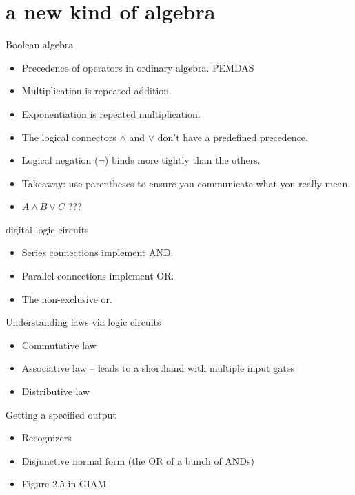 \documentclass[landscape]{beamer}
\begin{document}
\section{a new kind of algebra}

\begin{frame}{Boolean algebra}
\begin{itemize}
\item Precedence of operators in ordinary algebra. \pause PEMDAS \pause
\item Multiplication is repeated addition. \pause
\item Exponentiation is repeated multiplication. \pause
\item The logical connectors $\land$ and $\lor$ don't have a predefined precedence. \pause
\item Logical negation ($\lnot$) binds more tightly than the others. \pause
\item Takeaway: use parentheses to ensure you communicate what you really mean.\pause
\item $A \land B \lor C$ ???
\end{itemize}
\end{frame}

\begin{frame}{digital logic circuits}
\begin{itemize}
\item Series connections implement AND. \pause
\item Parallel connections implement OR. \pause
\item The non-exclusive or. \pause
\end{itemize}

\begin{center}

\end{center}
\end{frame}

\begin{frame}{Understanding laws via logic circuits}
\begin{itemize}
\item Commutative law 
\item Associative law -- leads to a shorthand with multiple input gates \pause
\item Distributive law
\end{itemize}
\end{frame}

\begin{frame}{Getting a specified output}
\begin{itemize}
\item Recognizers \pause
\item Disjunctive normal form \pause (the OR of a bunch of ANDs) \pause
\item Figure 2.5 in GIAM
\end{itemize}
\end{frame}
\end{document}

